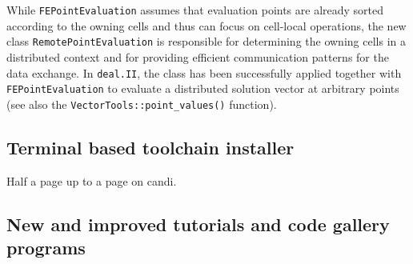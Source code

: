 \documentclass{ansarticle-preprint}
\begin{document}
While \texttt{FEPointEvaluation} assumes that evaluation points are already sorted according to 
the owning cells and thus can focus on cell-local operations, the new class
\texttt{RemotePointEvaluation} is responsible for determining the owning cells in a distributed
context and for providing efficient communication patterns for the data exchange. In \texttt{deal.II},
the class has been successfully applied together with \texttt{FEPointEvaluation} to evaluate a distributed
solution vector at arbitrary points (see also the
\texttt{VectorTools::point\_values()} function).


\subsection{Terminal based toolchain installer}
\label{subsec:candi}

Half a page up to a page on candi.

\subsection{New and improved tutorials and code gallery programs}
\label{subsec:steps}
\end{document}
